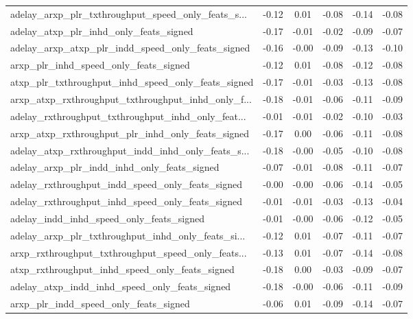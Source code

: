 \begin{tabular}{|l|*{4}{c}|r|}
adelay\_arxp\_plr\_txthroughput\_speed\_only\_feats\_s... & -0.12 &  0.01 &   -0.08 &      -0.14 & -0.08 \\
adelay\_atxp\_plr\_inhd\_only\_feats\_signed             & -0.17 & -0.01 &   -0.02 &      -0.09 & -0.07 \\
adelay\_arxp\_atxp\_plr\_indd\_speed\_only\_feats\_signed  & -0.16 & -0.00 &   -0.09 &      -0.13 & -0.10 \\
arxp\_plr\_inhd\_speed\_only\_feats\_signed              & -0.12 &  0.01 &   -0.08 &      -0.12 & -0.08 \\
atxp\_plr\_txthroughput\_inhd\_speed\_only\_feats\_signed & -0.17 & -0.01 &   -0.03 &      -0.13 & -0.08 \\
arxp\_atxp\_rxthroughput\_txthroughput\_inhd\_only\_f... & -0.18 & -0.01 &   -0.06 &      -0.11 & -0.09 \\
adelay\_rxthroughput\_txthroughput\_inhd\_only\_feat... & -0.01 & -0.01 &   -0.02 &      -0.10 & -0.03 \\
arxp\_atxp\_rxthroughput\_plr\_inhd\_only\_feats\_signed  & -0.17 &  0.00 &   -0.06 &      -0.11 & -0.08 \\
adelay\_atxp\_rxthroughput\_indd\_inhd\_only\_feats\_s... & -0.18 & -0.00 &   -0.05 &      -0.10 & -0.08 \\
adelay\_arxp\_plr\_indd\_inhd\_only\_feats\_signed        & -0.07 & -0.01 &   -0.08 &      -0.11 & -0.07 \\
adelay\_rxthroughput\_indd\_speed\_only\_feats\_signed   & -0.00 & -0.00 &   -0.06 &      -0.14 & -0.05 \\
adelay\_rxthroughput\_inhd\_speed\_only\_feats\_signed   & -0.01 & -0.01 &   -0.03 &      -0.13 & -0.04 \\
adelay\_indd\_inhd\_speed\_only\_feats\_signed           & -0.01 & -0.00 &   -0.06 &      -0.12 & -0.05 \\
adelay\_arxp\_plr\_txthroughput\_inhd\_only\_feats\_si... & -0.12 &  0.01 &   -0.07 &      -0.11 & -0.07 \\
arxp\_rxthroughput\_txthroughput\_speed\_only\_feats... & -0.13 &  0.01 &   -0.07 &      -0.14 & -0.08 \\
atxp\_rxthroughput\_inhd\_speed\_only\_feats\_signed     & -0.18 &  0.00 &   -0.03 &      -0.09 & -0.07 \\
adelay\_atxp\_indd\_inhd\_speed\_only\_feats\_signed      & -0.18 & -0.00 &   -0.06 &      -0.11 & -0.09 \\
arxp\_plr\_indd\_speed\_only\_feats\_signed              & -0.06 &  0.01 &   -0.09 &      -0.14 & -0.07 \\

\end{tabular}
